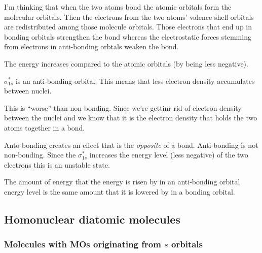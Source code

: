 \documentclass[../mit-general-chemistry.tex]{subfiles}
\begin{document}
\begin{remark}
  I'm thinking that when the two atoms bond the atomic orbitals form
  the molecular orbitals. Then the electrons from the two atoms'
  valence shell orbitals are redistributed among those molecule
  orbitals. Those electrons that end up in bonding orbitals strengthen
  the bond whereas the electrostatic forces stemming from electrons in
  anti-bonding orbtals weaken the bond.
\end{remark}


The energy increases compared to the atomic orbitals (by being less
negative).


$\sigma^*_{1s}$ is an anti-bonding orbital. This means that less
electron density accumulates between nuclei.


\begin{center}
  \begin{MOdiagram}[names,labels,labels-fs=\footnotesize]
    \EnergyAxis[title=$E$]
  \end{MOdiagram}
\end{center}

This is ``worse'' than non-bonding. Since we're gettinr rid of
electron density between the nuclei and we know that it is the
electron density that holds the two atoms together in a bond.

Anto-bonding creates an effect that is the {\em opposite} of a
bond. Anti-bonding is not non-bonding. Since the $\sigma^*_{1s}$
increases the energy level (less negative) of the two electrons this
is an unstable state.

The amount of energy that the energy is risen by in an anti-bonding
orbital energy level is the same amount that it is lowered by in a
bonding orbital.








\subsection{Homonuclear diatomic molecules}





\subsubsection{Molecules with MOs originating from $s$ orbitals}
\end{document}
